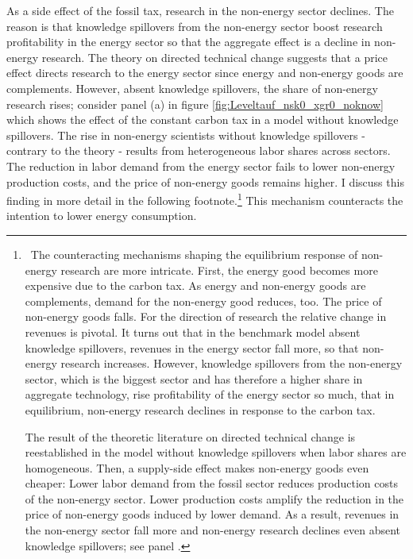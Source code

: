  As a side effect of the fossil tax, research in the non-energy sector declines. 
 The reason is that knowledge spillovers from the non-energy sector boost research profitability in the energy sector so that the aggregate effect is a decline in non-energy research. The theory on directed technical change suggests that a price effect directs research to the energy sector since energy and non-energy goods are complements.  However, absent knowledge spillovers, the share of non-energy research rises; consider panel (a) in figure \ref{fig:Leveltauf_nsk0_xgr0_noknow} which shows the effect of the constant carbon tax in a model without knowledge spillovers. The rise in non-energy scientists without knowledge spillovers - contrary to the theory - results from heterogeneous labor shares across sectors. The reduction in labor demand from the energy sector fails to lower non-energy production costs, and the price of non-energy goods remains higher. I discuss this finding in more detail in the following footnote.\footnote{\ The counteracting mechanisms shaping the equilibrium response of non-energy research are more intricate. First, the energy good becomes more expensive due to the carbon tax. As energy and non-energy goods are complements, demand for the non-energy good reduces, too. The price of non-energy goods falls. For the direction of research the relative change in revenues is pivotal. 
 It turns out that in the benchmark model absent knowledge spillovers, revenues in the energy sector fall more, so that non-energy research increases. However, knowledge spillovers from the non-energy sector, which is the biggest sector and has therefore a higher share in aggregate technology, rise profitability of the energy sector so much, that in equilibrium, non-energy research declines in response to the carbon tax. 
 
 The result of the theoretic literature \citep[e.g.][]{Hemous2021DirectedEconomics} on directed technical change is reestablished in the model without knowledge spillovers when labor shares are homogeneous. Then, a supply-side effect makes non-energy goods even cheaper: Lower labor demand from the fossil sector reduces production costs of the non-energy sector. Lower production costs amplify the reduction in the price of non-energy goods induced by lower demand.  As a result, revenues in the non-energy sector fall more and non-energy research declines even absent knowledge spillovers; see panel  .  } 
 This mechanism counteracts the intention to lower energy consumption. %
 
